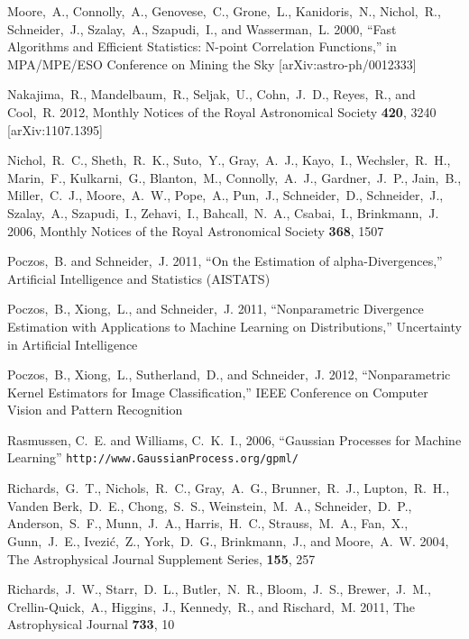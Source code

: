 \documentclass[useAMS,usenatbib,tightenlines,11pt,preprint]{aastex}
\begin{document}
\begin{thebibliography}{99}
Moore,~A., Connolly,~A., Genovese,~C., Grone,~L., Kanidoris,~N., Nichol,~R.,
Schneider,~J., Szalay,~A., Szapudi,~I., and Wasserman,~L. 2000,
``Fast Algorithms and Efficient Statistics: N-point Correlation Functions,'' in
MPA/MPE/ESO Conference on Mining the Sky [arXiv:astro-ph/0012333]

Nakajima,~R., Mandelbaum,~R., Seljak,~U., Cohn,~J.~D., Reyes,~R., and
Cool,~R. 2012, Monthly Notices of the Royal Astronomical Society {\bf 420}, 3240
[arXiv:1107.1395]

Nichol,~R.~C., Sheth,~R.~K., Suto,~Y., Gray,~A.~J., Kayo,~I., Wechsler,~R.~H.,
Marin,~F., Kulkarni,~G., Blanton,~M., Connolly,~A.~J., Gardner,~J.~P., Jain,~B.,
Miller,~C.~J., Moore,~A.~W., Pope,~A., Pun,~J., Schneider,~D., Schneider,~J.,
Szalay,~A., Szapudi,~I., Zehavi,~I., Bahcall,~N.~A., Csabai,~I., Brinkmann,~J.
2006, Monthly Notices of the Royal Astronomical Society {\bf 368}, 1507

Poczos,~B. and Schneider,~J. 2011, ``On the Estimation of alpha-Divergences,''
Artificial Intelligence and Statistics (AISTATS)

Poczos,~B., Xiong,~L., and Schneider,~J. 2011, ``Nonparametric Divergence Estimation with
Applications to Machine Learning on Distributions,''  Uncertainty in Artificial
Intelligence

Poczos,~B., Xiong,~L., Sutherland,~D., and Schneider,~J. 2012,
``Nonparametric Kernel Estimators for Image Classification,''
IEEE Conference on Computer Vision and Pattern Recognition

Rasmussen, C.~E. and Williams, C.~K.~I., 2006, ``Gaussian
Processes for Machine Learning''
\verb|http://www.GaussianProcess.org/gpml/|

Richards,~G.~T., Nichols,~R.~C., Gray,~A.~G., Brunner,~R.~J., Lupton,~R.~H.,
Vanden Berk,~D.~E., Chong,~S.~S., Weinstein,~M.~A., Schneider,~D.~P.,
Anderson,~S.~F., Munn,~J.~A., Harris,~H.~C., Strauss,~M.~A., Fan,~X.,
Gunn,~J.~E., Ivezi\'c,~Z., York,~D.~G., Brinkmann,~J., and Moore,~A.~W. 2004,
The Astrophysical Journal Supplement Series, {\bf 155}, 257

Richards,~J.~W., Starr,~D.~L., Butler,~N.~R., Bloom,~J.~S., Brewer,~J.~M.,
Crellin-Quick,~A., Higgins,~J., Kennedy,~R., and Rischard,~M. 2011,
The Astrophysical Journal {\bf 733}, 10


\end{thebibliography}
\end{document}

